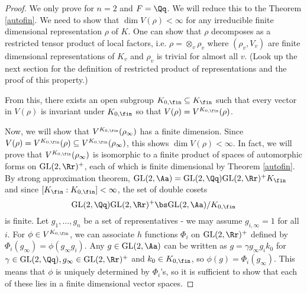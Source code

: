\begin{proof}
We only prove for $n = 2$ and $F = \Qq$. We will reduce this to the Theorem \ref{autofin}. 
We need to show that $\dim V(\rho) < \infty$ for any irreducible finite dimensional representation $\rho$ of $K$. 
One can show that $\rho$ decomposes as a restricted tensor product of local factors, i.e. $\rho = \otimes_{v} \rho_{v}$ where $(\rho_{v}, V_{v})$ are finite dimensional representations of $K_v$ and $\rho_v$ is trivial for almost all $v$. (Look up the next section for the definition of restricted product of representations and the proof of this property.)
\begin{comment}
Indeed, no small subgroup argument implies that $\ker \rho$ contains an open subgroup of $K_{\fin}$, so ti contains $K_v$ for all but finitely many $v$. 
Then $\rho$ factors through the projection 
$$
K \twoheadrightarrow K/ \left[ \prod_{v\not\in S}K_v\right] \simeq \prod_{v\in S} K_v
$$
for some finite set of places $S$ containing $S_{\infty}$. 
Now $\rho$ is a representation of a finite direct product of compact groups, and it factors as $\otimes_{v\in S} \rho_v$ where $\rho_v$ is an irreducible representation of $K_v$. Then the original $\rho$ is the restricted tensor product of $\rho_v$'s where $(\rho_v, V_v)$ are trivial for $v\not\in S$. 
\end{comment}
From this, there exists an open subgroup $K_{0, \fin}\subseteq K_{\fin}$ such that every vector in $V(\rho)$ is invariant under $K_{0, \fin}$ so that $V(\rho) = V^{K_{0,\fin}}(\rho)$. 

Now, we will show that $V^{K_{0, \fin}}(\rho_\infty)$ has a finite dimension. Since $V(\rho) = V^{K_{0, \fin}}(\rho) \subseteq V^{K_{0, \fin}}(\rho_{\infty})$, this shows  $\dim V(\rho) <\infty$. 
In fact, we will prove that $V^{K_{0, \fin}}(\rho_{\infty})$ is isomorphic  to  a finite product of spaces of automorphic forms on $\GL(2, \Rr)^{+}$, each of which is finite dimensional by Theorem \ref{autofin}. By strong approximation theorem, $\GL(2, \Aa) =\GL(2,\Qq)\GL(2, \Rr)^{+}K_\fin$ and since $[K_{\fin}:K_{0, \fin}] < \infty$, the set of double cosets
$$
\GL(2, \Qq) \GL(2, \Rr)^{+} \bs \GL(2, \Aa)/K_{0, \fin}
$$
is finite. 
Let $g_1, \dots, g_n$ be a set of representatives - we may assume $g_{i, \infty} = 1$ for all $i$. For $\phi\in V^{K_{0, \fin}}$, we can associate $h$ functions $\Phi_i$ on $\GL(2, \Rr)^{+}$  defined by $\Phi_{i}(g_\infty) = \phi(g_{\infty}g_{i})$. 
Any $g\in \GL(2, \Aa)$ can be written as $g = \gamma g_{\infty}g_{i}k_{0}$ for $\gamma\in \GL(2, \Qq), g_{\infty} \in \GL(2, \Rr)^{+}$ and $k_{0} \in K_{0, \fin}$, so $\phi(g) = \Phi_{i}(g_{\infty})$. 
This means that $\phi$ is uniquely determined by $\Phi_i$'s, so it is sufficient to show that each of these lies in a finite dimensional vector spaces. 


\end{proof}

